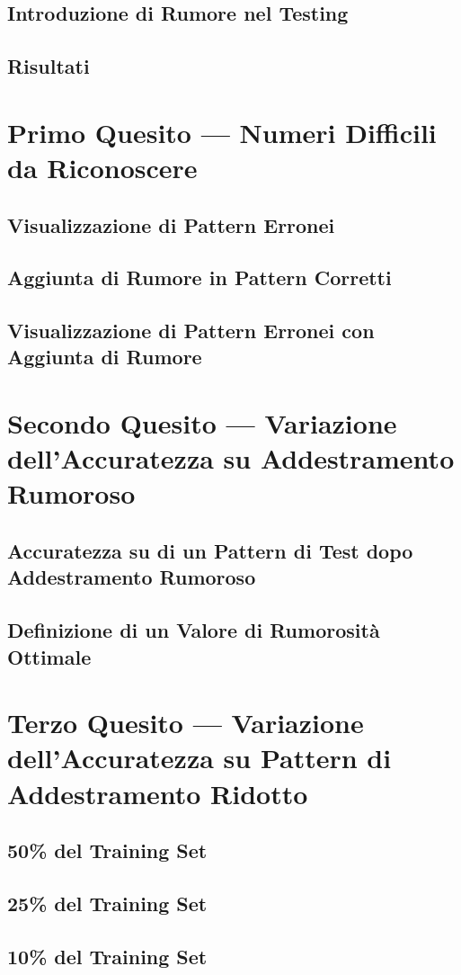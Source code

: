 \documentclass[12pt, a4paper]{article}
\begin{document}
\subsection{Introduzione di Rumore nel Testing}
\subsection{Risultati}

\newpage
\section{Primo Quesito --- Numeri Difficili da Riconoscere}
\subsection{Visualizzazione di Pattern Erronei}
\subsection{Aggiunta di Rumore in Pattern Corretti}
\subsection{Visualizzazione di Pattern Erronei con Aggiunta di Rumore}

\newpage
\section{Secondo Quesito --- Variazione dell'Accuratezza su Addestramento Rumoroso}
\subsection{Accuratezza su di un Pattern di Test dopo Addestramento Rumoroso}
\subsection{Definizione di un Valore di Rumorosità Ottimale}

\newpage
\section{Terzo Quesito --- Variazione dell'Accuratezza su Pattern di Addestramento Ridotto}
\subsection{50\% del Training Set}
\subsection{25\% del Training Set}
\subsection{10\% del Training Set}
\end{document}
